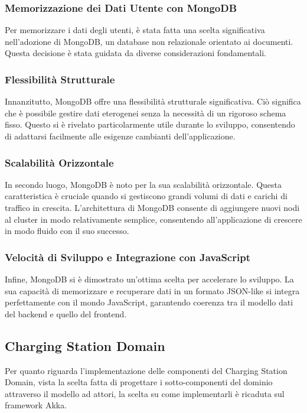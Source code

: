 \subsubsection{Memorizzazione dei Dati Utente con MongoDB}

Per memorizzare i dati degli utenti, è stata fatta una scelta significativa nell'adozione
di MongoDB, un database non relazionale orientato ai documenti. Questa decisione è
stata guidata da diverse considerazioni fondamentali.

\subsubsection{Flessibilità Strutturale}

Innanzitutto, MongoDB offre una flessibilità strutturale significativa. Ciò significa
che è possibile gestire dati eterogenei senza la necessità di un rigoroso schema fisso.
Questo si è rivelato particolarmente utile durante lo sviluppo, consentendo di adattarsi
facilmente alle esigenze cambianti dell'applicazione.

\subsubsection{Scalabilità Orizzontale}

In secondo luogo, MongoDB è noto per la sua scalabilità orizzontale. Questa caratteristica
è cruciale quando si gestiscono grandi volumi di dati e carichi di traffico in crescita.
L'architettura di MongoDB consente di aggiungere nuovi nodi al cluster in modo relativamente
semplice, consentendo all'applicazione di crescere in modo fluido con il suo successo.

\subsubsection{Velocità di Sviluppo e Integrazione con JavaScript}

Infine, MongoDB si è dimostrato un'ottima scelta per accelerare lo sviluppo. La sua capacità
di memorizzare e recuperare dati in un formato JSON-like si integra perfettamente con il mondo
JavaScript, garantendo coerenza tra il modello dati del backend e quello del frontend.


\subsection{Charging Station Domain}
Per quanto riguarda l'implementazione delle componenti del Charging Station Domain, vista
la scelta fatta di progettare i sotto-componenti del dominio attraverso il modello ad attori,
la scelta su come implementarli è
ricaduta sul framework Akka.\\

